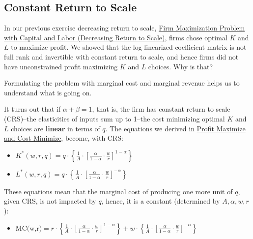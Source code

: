 \documentclass[
]{book}
\providecommand{\tightlist}{%
  \setlength{\itemsep}{0pt}\setlength{\parskip}{0pt}}
\begin{document}
\hypertarget{constant-return-to-scale}{%
\subsection{Constant Return to Scale}\label{constant-return-to-scale}}

In our previous exercise decreasing return to scale, \href{https://math4econ.github.io/matrix_application/KL_borrowhire_firm.html}{Firm Maximization
Problem with Capital and Labor (Decreasing Return to
Scale)},
firms chose optimal \(K\) and \(L\) to maximize profit. We showed that the
log linearized coefficient matrix is not full rank and invertible with
constant return to scale, and hence firms did not have unconstrained
profit maximizing \(K\) and \(L\) choices. Why is that?

Formulating the problem with marginal cost and marginal revenue helps us
to understand what is going on.

It turns out that if \(\alpha +\beta =1\), that is, the firm has constant
return to scale (CRS)--the elasticities of inputs sum up to 1--the cost
minimizing optimal \(K\) and \(L\) choices are \textbf{linear} in terms of \(q\).
The equations we derived in \href{https://math4econ.github.io/opti_firm_constrained/profit_maximize.html}{Profit Maximize and Cost
Minimize},
become, with CRS:

\begin{itemize}
\item
  \(\displaystyle K^* (w,r,q)=q\cdot \left\lbrace \frac{1}{A}\cdot {\left\lbrack \frac{\alpha }{1-\alpha }\cdot \frac{w}{r}\right\rbrack }^{1-\alpha } \right\rbrace\)
\item
  \(\displaystyle L^* (w,r,q)=q\cdot \left\lbrace \frac{1}{A}\cdot {\left\lbrack \frac{\alpha }{1-\alpha }\cdot \frac{w}{r}\right\rbrack }^{-\alpha } \right\rbrace\)
\end{itemize}

These equations mean that the marginal cost of producing one more unit
of \(q\), given CRS, is not impacted by \(q\), hence, it is a constant
(determined by \(A,\alpha ,w,r\)):

\begin{itemize}
\tightlist
\item
  \(\displaystyle \textrm{MC(w,r)}=r\cdot \left\lbrace \frac{1}{A}\cdot {\left\lbrack \frac{\alpha }{1-\alpha }\cdot \frac{w}{r}\right\rbrack }^{1-\alpha } \right\rbrace +w\cdot \left\lbrace \frac{1}{A}\cdot {\left\lbrack \frac{\alpha }{1-\alpha }\cdot \frac{w}{r}\right\rbrack }^{-\alpha } \right\rbrace\)
\end{itemize}
\end{document}
